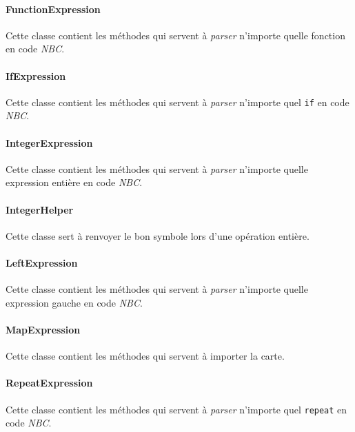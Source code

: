 \paragraph{FunctionExpression}

Cette classe contient les méthodes qui servent à \emph{parser} n'importe quelle fonction en code \emph{NBC}.

\paragraph{IfExpression}

Cette classe contient les méthodes qui servent à \emph{parser} n'importe quel \texttt{if} en code \emph{NBC}.

\paragraph{IntegerExpression}

Cette classe contient les méthodes qui servent à \emph{parser} n'importe quelle expression entière en code \emph{NBC}.

\paragraph{IntegerHelper}

Cette classe sert à renvoyer le bon symbole lors d'une opération entière.

\paragraph{LeftExpression}

Cette classe contient les méthodes qui servent à \emph{parser} n'importe quelle expression gauche en code \emph{NBC}.

\paragraph{MapExpression}

Cette classe contient les méthodes qui servent à importer la carte.

\paragraph{RepeatExpression}

Cette classe contient les méthodes qui servent à \emph{parser} n'importe quel \texttt{repeat} en code \emph{NBC}.

